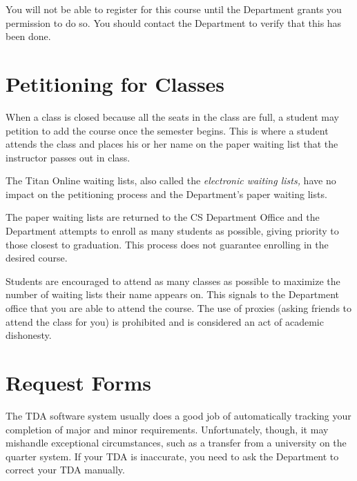 \documentclass{book}
\begin{document}
You will not be able to register for this course until the Department grants you permission to do so. You should contact the Department to verify that this has been done.

\section{Petitioning for Classes}

When a class is closed because all the seats in the class are full, a
student may petition to add the course once the semester begins. This
is where a student attends the class and places his or her name on the
paper waiting list that the instructor passes out in class.

The Titan Online waiting lists, also called the \emph{electronic
  waiting lists,} have no impact on the petitioning process and the
Department's paper waiting lists.

The paper waiting lists are returned to the CS Department Office and
the Department attempts to enroll as many students as possible, giving
priority to those closest to graduation. This process does not
guarantee enrolling in the desired course.

Students are encouraged to attend as many classes as possible to
maximize the number of waiting lists their name appears on. This
signals to the Department office that you are able to attend the
course. The use of proxies (asking friends to attend the class for
you) is prohibited and is considered an act of academic dishonesty.

\section{Request Forms}
\label{section:request_forms}

The TDA software system usually does a good job of automatically
tracking your completion of major and minor
requirements. Unfortunately, though, it may mishandle exceptional
circumstances, such as a transfer from a university on the quarter
system. If your TDA is inaccurate, you need to ask the Department to
correct your TDA manually.
\end{document}
